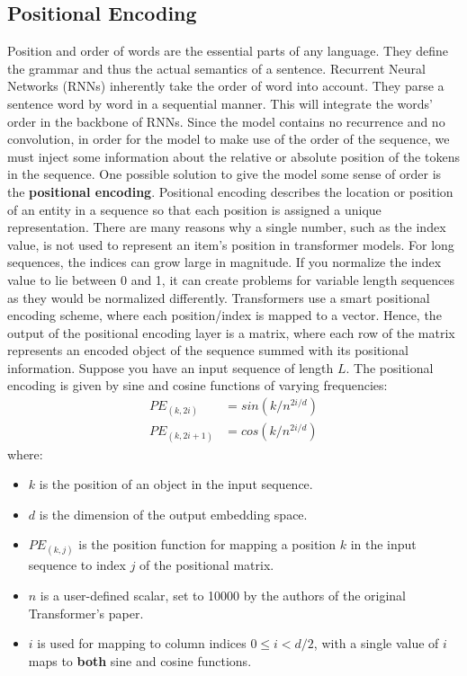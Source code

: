 \subsection{Positional Encoding}
Position and order of words are the essential parts of any language. They define the grammar and thus the actual semantics of a sentence. Recurrent Neural Networks (RNNs) inherently take the order of word into account. They parse a sentence word by word in a sequential manner. This will integrate the words’ order in the backbone of RNNs.
\newline\newline
Since the model contains no recurrence and no convolution, in order for the model to make use of the order of the sequence, we must inject some information about the relative or absolute position of the tokens in the sequence.\newline\newline
One possible solution to give the model some sense of order is the \textbf{positional encoding}.\newline\newline
Positional encoding describes the location or position of an entity in a sequence so that each position is assigned a unique representation. There are many reasons why a single number, such as the index value, is not used to represent an item’s position in transformer models. For long sequences, the indices can grow large in magnitude. If you normalize the index value to lie between 0 and 1, it can create problems for variable length sequences as they would be normalized differently.\newline\newline
Transformers use a smart positional encoding scheme, where each position/index is mapped to a vector. Hence, the output of the positional encoding layer is a matrix, where each row of the matrix represents an encoded object of the sequence summed with its positional information.\newline\newline
Suppose you have an input sequence of length $L$. The positional encoding is given by sine and cosine functions of varying frequencies:
\[
\begin{split}
    PE_{(k, 2i)} & = sin(k/n^{2i/d})\\
    PE_{(k, 2i + 1)} & = cos(k/n^{2i/d})
\end{split}
\]
where:
\begin{itemize}
    \item $k$ is the position of an object in the input sequence.
    \item $d$ is the dimension of the output embedding space.
    \item $PE_{(k,j)}$ is the position function for mapping a position $k$ in the input sequence to index $j$ of the positional matrix.
    \item $n$ is a user-defined scalar, set to 10000 by the authors of the original Transformer's paper.
    \item $i$ is used for mapping to column indices $ 0 \leq i < d/2$, with a single value of $i$ maps to \textbf{both} sine and cosine functions.
\end{itemize}
